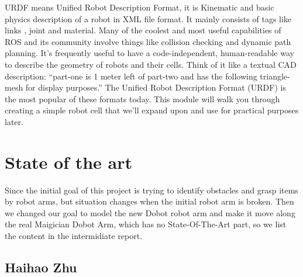 \documentclass[10pt,twocolumn,letterpaper]{article}
\begin{document}
URDF means Unified Robot Description Format, it is Kinematic and basic physics description of a robot in XML file format. It mainly consists of tags like links , joint and material.  Many of the coolest and most useful capabilities of ROS and its community involve things like collision checking and dynamic path planning. It’s frequently useful to have a code-independent, human-readable way to describe the geometry of robots and their cells. Think of it like a textual CAD description: “part-one is 1 meter left of part-two and has the following triangle-mesh for display purposes.” The Unified Robot Description Format (URDF) is the most popular of these formats today. This module will walk you through creating a simple robot cell that we’ll expand upon and use for practical purposes later.

\section{State of the art}

Since the initial goal of this project is trying to identify obstacles and grasp items by robot arms, but situation changes when the initial robot arm is broken. Then we changed our goal to model the new Dobot robot arm and make it move along the real Maigician Dobot Arm, which has no State-Of-The-Art part, so we list the content in the intermidiate report.

\subsection{Haihao Zhu}
\end{document}

